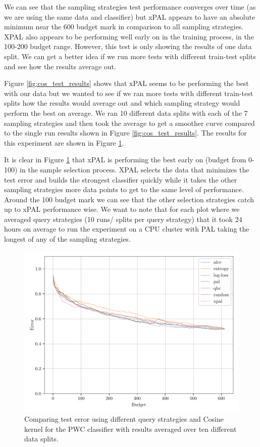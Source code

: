 We can see that the sampling strategies test performance converges over time (as we are using the same data and classifier) but xPAL appears to have an absolute minimum near the 600 budget mark in comparison to all sampling strategies. XPAL also appears to be performing well early on in the training process, in the 100-200 budget range. However, this test is only showing the results of one data split. We can get a better idea if we run more tests with different train-test splits and see how the results average out.

Figure \ref{fig:cos_test_results} shows that xPAL seems to be performing the best with our data but we wanted to see if we ran more tests with different train-test splits how the results would average out and which sampling strategy would perform the best on average. We ran 10 different data splits with each of the 7 sampling strategies and then took the average to get a smoother curve compared to the single run results shown in Figure \ref*{fig:cos_test_results}. The results for this experiment are shown in Figure \ref{fig:cos_avg_test_results}. 

It is clear in Figure \ref{fig:cos_avg_test_results} that xPAL is performing the best early on (budget from 0-100) in the sample selection process. XPAL selects the data that minimizes the test error and builds the strongest classifier quickly while it takes the other sampling strategies more data points to get to the same level of performance. Around the 100 budget mark we can see that the other selection strategies catch up to xPAL performance wise. We want to note that for each plot where we averaged query strategies (10 runs/ splits per query strategy) that it took 24 hours on average to run the experiment on a CPU cluster with PAL taking the longest of any of the sampling strategies.

\begin{figure}[ht]
    \centering
    \includegraphics[width=\scale\textwidth]{../img/plot_kernel_cos_averaged_test_results.pdf}
    \caption{Comparing test error using different query strategies and Cosine kernel for the PWC classifier with results averaged over ten different data splits.}
    \label{fig:cos_avg_test_results}
\end{figure}


